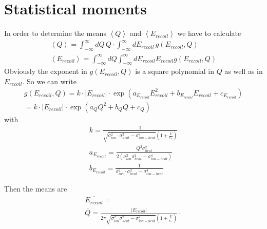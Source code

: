 \documentclass[10pt, a4paper]{article}
\begin{document}
\section{Statistical moments}
In order to determine the means $\left \langle Q \right \rangle$ and $\left \langle E_{recoil} \right \rangle$ we have to calculate
\begin{gather}
\left \langle Q \right \rangle = \int_{-\infty}^{\infty} dQ \, Q \cdot  \int_{-\infty}^{\infty} dE_{recoil} \, g(E_{recoil},Q) \\
\left \langle E_{recoil} \right \rangle = \int_{-\infty}^{\infty} dQ \int_{-\infty}^{\infty} dE_{recoil} E_{recoil} g(E_{recoil},Q)
\end{gather}
Obviously the exponent in $g(E_{recoil},Q)$ is a square polynomial in $Q$ as well as in $E_{recoil}$.
So we can write
\begin{gather}
g(E_{recoil},Q) = k \cdot \left| E_{recoil} \right| \cdot \exp \left( a_{E_{recoil}} E_{recoil}^2 + b_{E_{recoil}} E_{recoil} + c_{E_{recoil}} \right) \\
= k \cdot \left| E_{recoil} \right| \cdot \exp \left( a_Q Q^2 + b_Q Q + c_Q \right)
\end{gather}
with
\begin{gather}
k = \frac{1}{\sqrt{\sigma_{ion}^2 \cdot \sigma_{heat}^2 - \sigma_{ion-heat}^4} \left(1 + \frac{V}{\epsilon_\gamma} \right)} \\
a_{E_{recoil}} = \frac{Q^2 \sigma_{heat}^2}{2 \left( \sigma_{ion}^2 \sigma_{heat}^2 - \sigma_{ion-heat}^4 \right)} \\
b_{E_{recoil}} = \frac{1}{\sigma_{ion}^2 \cdot \sigma_{heat}^2 - \sigma_{ion-heat}^4}
\end{gather}

Then the means are
\begin{gather}
\overline{E_{recoil}} = \\
\overline{Q} = \frac{\left| E_{recoil} \right| }{2 \pi \sqrt{\sigma_{ion}^2 \sigma_{heat}^2 - \sigma_{ion-heat}^4} \left(1 + \frac{V}{\epsilon_\gamma}\right)} \cdot 
\end{gather}
\end{document}
